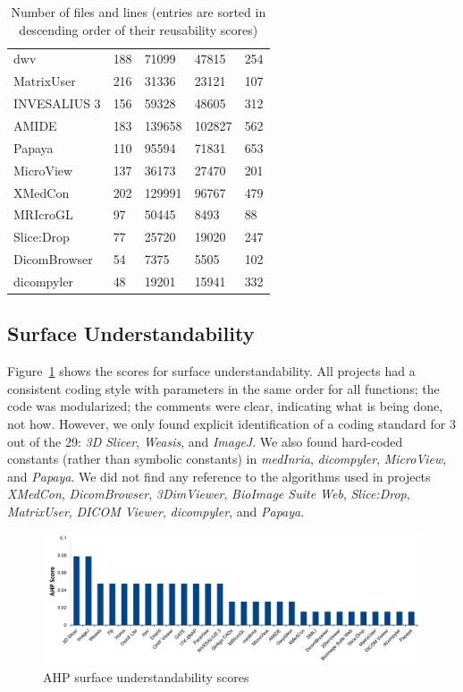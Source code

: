 \documentclass[final, 3p, times, authoryear]{elsarticle}
\begin{document}
\begin{table}[!ht]
\begin{tabular}{lllll}
dwv & 188 & 71099 & 47815 & 254 \\
MatrixUser & 216 & 31336 & 23121 & 107 \\
INVESALIUS 3 & 156 & 59328 & 48605 & 312 \\
AMIDE & 183 & 139658 & 102827 & 562 \\
Papaya & 110 & 95594 & 71831 & 653 \\
MicroView & 137 & 36173 & 27470 & 201 \\
XMedCon & 202 & 129991 & 96767 & 479 \\
MRIcroGL & 97 & 50445 & 8493 & 88 \\
Slice:Drop & 77 & 25720 & 19020 & 247 \\
DicomBrowser & 54 & 7375 & 5505 & 102 \\
dicompyler & 48 & 19201 & 15941 & 332 \\ 
\bottomrule
\end{tabular}
\caption{Number of files and lines (entries are sorted in descending order of
their reusability scores)}
\label{tab_loc_per_file}
\end{table}

\subsection{Surface Understandability} \label{sec_result_understandability}

Figure~\ref{fg_surface_understandability_scores} shows the scores for surface
understandability. All projects had a consistent coding style with parameters in
the same order for all functions; the code was modularized; the comments were
clear, indicating what is being done, not how. However, we only found explicit
identification of a coding standard for 3 out of the 29: \textit{3D Slicer},
\textit{Weasis}, and \textit{ImageJ}. We also found hard-coded constants (rather
than symbolic constants) in \textit{medInria}, \textit{dicompyler},
\textit{MicroView}, and \textit{Papaya}. We did not find any reference to the
algorithms used in projects \textit{XMedCon}, \textit{DicomBrowser},
\textit{3DimViewer}, \textit{BioImage Suite Web}, \textit{Slice:Drop},
\textit{MatrixUser}, \textit{DICOM Viewer}, \textit{dicompyler}, and
\textit{Papaya}. 

\begin{figure}[!ht]
\includegraphics[scale=0.48]{figures/understandability_scores.pdf}
\caption{AHP surface understandability scores}
\label{fg_surface_understandability_scores}
\end{figure}
\end{document}
